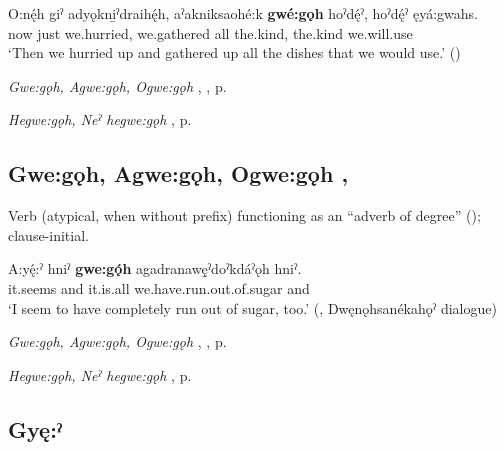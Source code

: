 \ea
\label{ex:gpar117}
\gll O:nę́h giˀ adyǫkni̱ˀdraihę́h, aˀakniksaohé:k \textbf{gwé:gǫh} hoˀdę́ˀ, hoˀdę́ˀ ęyá:gwahs.\\
now just we.hurried, we.gathered all the.kind, the.kind we.will.use\\
\glt ‘Then we hurried up and gathered up all the dishes that we would use.’ (\cite{henry_de_2005})
\z

\begin{CayugaRelated}
\item \textit{Gwe:gǫh, Agwe:gǫh, Ogwe:gǫh} , , p. \pageref{p:[gwe:gǫh] ‘totally’}\\
\item \textit{Hegwe:gǫh, Neˀ hegwe:gǫh} , p. \pageref{p:[neˀ hegwe:gǫh]}
\end{CayugaRelated}


\subsection*{\textbf{Gwe:gǫh, Agwe:gǫh, Ogwe:gǫh} , } \label{p:[gwe:gǫh] ‘totally’}
Verb (atypical, when without  prefix) functioning as an “adverb of degree” (); clause-initial.

\ea
\label{ex:gpar118}
\gll A:yę́:ˀ hniˀ \textbf{gwe:gǫ́h} agadranawę̱ˀdoˀkdáˀǫh hniˀ.\\
it.seems and it.is.all we.have.run.out.of.sugar and\\
\glt ‘I seem to have completely run out of sugar, too.’ (\cite[441]{mithun_watewayestanih_1984}, Dwęnǫhsanékahǫˀ dialogue)
\z

\begin{CayugaRelated}
\item \textit{Gwe:gǫh, Agwe:gǫh, Ogwe:gǫh} , , p. \pageref{p:[gwe:gǫh] ‘all’}\\
\item \textit{Hegwe:gǫh, Neˀ hegwe:gǫh} , p. \pageref{p:[neˀ hegwe:gǫh]}
\end{CayugaRelated}


\subsection*{\textbf{Gyę:ˀ} } \label{p:[gyę:ˀ]}

